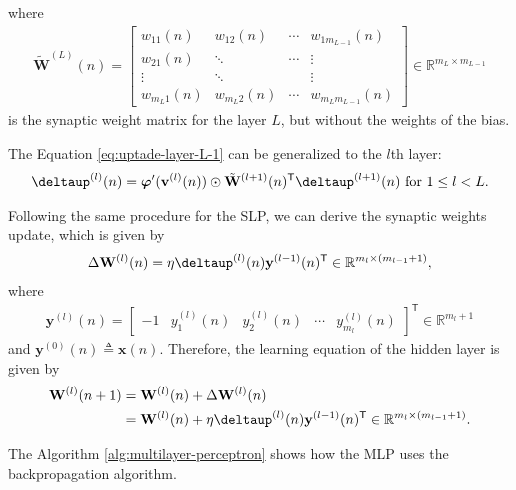 \documentclass[12pt,a4paper]{article}
\newcommand{\trans}{\mathsf{T}}
\newcommand{\Real}{\mathbb{R}}
\begin{document}
where
\begin{align}
    \tilde{\mathbf{W}}^{(L)}(n) = \begin{bmatrix}
        w_{11} (n) & w_{12} (n) & \cdots & w_{1 m_{L-1}} (n) \\
        w_{21} (n) & \ddots & \cdots & \vdots \\
        \vdots & \ddots & & \vdots \\
        w_{m_L1} (n) & w_{m_L2} (n) & \cdots & w_{m_Lm_{L-1}} (n)
    \end{bmatrix} \in \Real^{m_L \times m_{L-1}}
\end{align}
is the synaptic weight matrix for the layer \(L\), but without the weights of the bias.

The Equation \eqref{eq:uptade-layer-L-1} can be generalized to the \(l\)th layer:
\begin{align}
    \boldsymbol{\deltaup}^{(l)} (n) = \boldsymbol{\varphi}'(\mathbf{v}^{(l)}(n)) \odot \tilde{\mathbf{W}}^{(l+1)}(n)^\trans \boldsymbol{\deltaup}^{(l+1)} (n)\text{ for } 1\leq l < L.
    \label{eq:uptade-layer-l}
\end{align}

Following the same procedure for the SLP, we can derive the synaptic weights update, which is given by
\begin{align}
    \Delta \mathbf{W}^{(l)}(n) = \eta\boldsymbol{\deltaup}^{(l)}(n) \mathbf{y}^{(l-1)}(n)^\trans \in \Real^{m_l \times (m_{l-1}+1)},
\end{align}
where
\begin{align}
    \mathbf{y}^{(l)}(n) = \begin{bmatrix}
        -1 & y_1^{(l)}(n) & y_2^{(l)}(n) & \cdots & y_{m_{l}}^{(l)}(n)
    \end{bmatrix}^\trans \in \Real^{m_{l}+1}
\end{align}
and \(\mathbf{y}^{(0)}(n) \triangleq \mathbf{x}(n)\). Therefore, the learning equation of the hidden layer is given by
\begin{align}
    \mathbf{W}^{(l)}(n+1) & = \mathbf{W}^{(l)}(n) + \Delta \mathbf{W}^{(l)}(n) \nonumber \\
    & = \mathbf{W}^{(l)}(n) + \eta\boldsymbol{\deltaup}^{(l)}(n) \mathbf{y}^{(l-1)}(n)^\trans \in \Real^{m_l \times (m_{l-1}+1)}.
\end{align}


The Algorithm \ref{alg:multilayer-perceptron} shows how the MLP uses the backpropagation algorithm.
\end{document}
